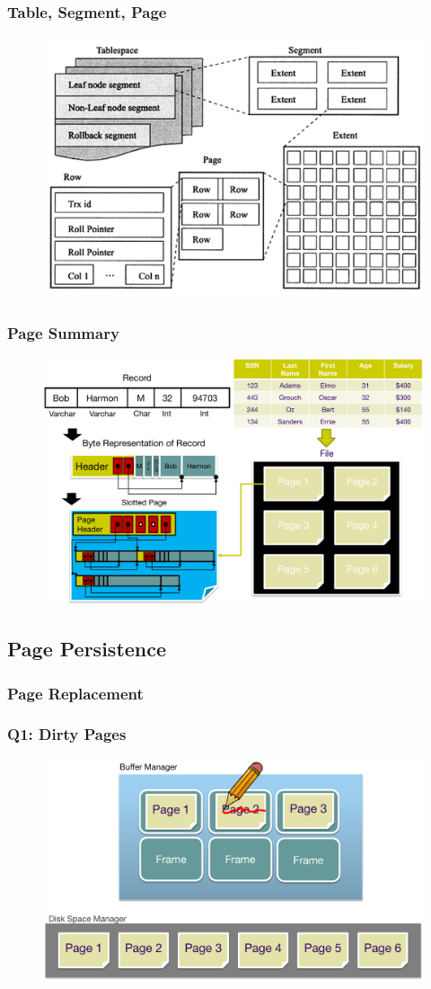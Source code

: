 \begin{frame}[fragile]
	\frametitle{Table, Segment, Page}
	\begin{figure}
		\includegraphics[width=.68\linewidth]{figs/dbfile-table-seg-page2.png}
	\end{figure}
\end{frame}


\begin{frame}[fragile]
	\frametitle{Page Summary}
	\begin{figure}
		\includegraphics[width=.68\linewidth]{figs/dbfile-page-summary.pdf}
	\end{figure}
\end{frame}


\subsection{Page Persistence}

\subsubsection{Page Replacement}

\begin{frame}[fragile]
	\frametitle{Q1: Dirty Pages}
	\begin{figure}
		\includegraphics[width=.68\linewidth]{figs/dbfile-dirtypage.pdf}
	\end{figure}
\end{frame}

